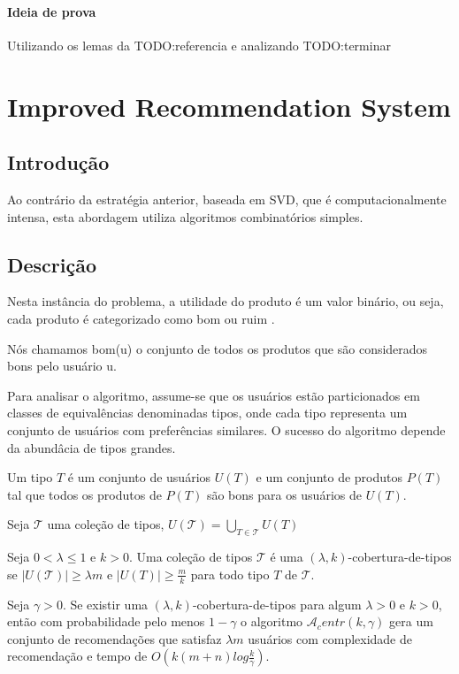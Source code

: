 \documentclass[a4paper,10pt]{article}
\begin{document}
\paragraph{Ideia de prova\\} 
Utilizando os lemas da TODO:referencia e  analizando TODO:terminar

\section{Improved Recommendation System}

\subsection{Introdução}
Ao contrário da estratégia anterior, baseada em SVD, que é computacionalmente
intensa, esta abordagem utiliza algoritmos combinatórios simples. 


\subsection{Descrição}

Nesta instância do problema, a utilidade do produto é um valor binário, ou seja,
cada produto é categorizado como bom ou ruim .

Nós chamamos bom(u) o conjunto de todos os produtos que são considerados bons
pelo usuário u.

Para analisar o algoritmo, assume-se que os usuários estão particionados em
classes de equivalências denominadas tipos, onde cada tipo representa um conjunto
de usuários com preferências similares. O sucesso do algoritmo depende da abundâcia
de tipos grandes. 

\begin{definicao}
Um tipo $T$ é um conjunto de usuários $U(T)$ e um conjunto de produtos $P(T)$ tal que
todos os produtos de $P(T)$ são bons para os usuários de $U(T)$.
\end{definicao}

\begin{definicao}
Seja $\mathcal{T}$ uma coleção de tipos, $U(\mathcal{T}) = \bigcup _{T \in \mathcal{T}} U(T)$ 
\end{definicao}

\begin{definicao}
Seja $0 < \lambda \leq 1$ e $k > 0$. Uma coleção de tipos $\mathcal{T}$ é uma $(\lambda, k)$-cobertura-de-tipos se $\vert U(\mathcal{T}) \vert \geq \lambda m$ e $\vert  U(T) \vert \geq \frac{m}{k}$ para todo tipo $T$ de $\mathcal{T}$. 
\end{definicao}


\begin{teo}
  Seja $\gamma > 0 $. Se existir uma $(\lambda, k)$-cobertura-de-tipos para algum $\lambda > 0 $ e $k > 0$, então com probabilidade pelo menos $1 - \gamma$ o algoritmo $\mathcal{A}_centr(k, \gamma)$ gera um conjunto de recomendações que satisfaz $\lambda m$ usuários com complexidade de recomendação e tempo de $O(k(m+n)log\frac{k}{\gamma})$.
\end{teo}



\end{document}

